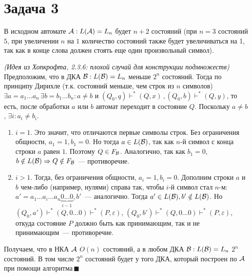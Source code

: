 \documentclass[a4paper]{article}
\def\A{{\cal A}}
\def\B{{\cal B}}
\begin{document}
\section*{Задача 3}
В исходном автомате $\A: L(\A)=L_n$ будет $n+2$ состояний (при $n=3$ состояний $5$, при увеличении $n$ на $1$ количество состояний также будет увеличиваться на 1, так как в конце слова должен стоять еще один произвольный символ).
\begin{center}
\end{center}
{\em{(Идея из Хопкрофта, 2.3.6: плохой случай для конструкции подмножеств)}}
\\[3pt]
Предположим, что в ДКА $\B:L(\B)=L_n$ меньше $2^n$ состояний. Тогда по принципу Дирихле (т.к. состояний меньше, чем строк из $n$ символов) $\exists a=a_1\dots a_n\,\exists b=b_1\dots b_n:a\neq b$ и $(Q_0,q)\vdash^*(Q,x)\,,(Q_0,b)\vdash^*(Q,y)$, то есть, после обработки $a$ или $b$ автомат переходит в состояние $Q$. Поскольку $a\neq b$, $\exists i:a_i\neq b_i$.
\begin{enumerate}[1.]
\item $i=1$. Это значит, что отличаются первые символы строк. Без ограничения общности, $a_1=1, b_1=0$. Но тогда $a\in L(\B)$, так как $n$-й символ с конца строки $a$ равен $1$. Поэтому $Q\in F_\B$.\newline
Аналогично, так как $b_1=0$, $b\notin L(\B)\Rightarrow Q\notin F_\B$~--- противоречие.
\item $i>1$. Тогда, без ограничения общности, $a_i=1, b_i=0$. Дополним строки $a$ и $b$ чем-либо (например, нулями) справа так, чтобы $i$-й символ стал $n$-м:
$a'=a_1\dots a_i\dots a_n\underbrace{0\dots 0}_{i-1}, b'$~--- аналогично. Тогда $a'\in L(\B), b'\notin L(\B)$.\newline
Но $(Q_0,a')\vdash^*(Q,0\dots 0)\vdash^*(P,\varepsilon)$,\newline
$(Q_0,b')\vdash^*(Q,0\dots 0)\vdash^*(P,\varepsilon)$, откуда состояние $P$ должно быть как принимающим, так и не принимающим~--- противоречие.
\end{enumerate}
Получаем, что в НКА $\A$ $O(n)$ состояний, а в любом ДКА $\B: L(\B)=L_n$ $2^n$ состояний. В том числе $2^n$ состояний будет у того ДКА, который построен по $\A$ при помощи алгоритма$\,\blacksquare$
\end{document}
